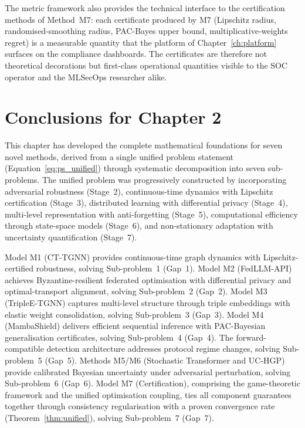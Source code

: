 The metric framework also provides the technical interface to the certification methods of Method~M7: each certificate produced by M7 (Lipschitz radius, randomised-smoothing radius, PAC-Bayes upper bound, multiplicative-weights regret) is a measurable quantity that the platform of Chapter~\ref{ch:platform} surfaces on the compliance dashboards. The certificates are therefore not theoretical decorations but first-class operational quantities visible to the SOC operator and the MLSecOps researcher alike.

\section{Conclusions for Chapter 2}
\label{sec:ch2_summary}

This chapter has developed the complete mathematical foundations for seven novel methods, derived from a single unified problem statement (Equation~\eqref{eq:ps_unified}) through systematic decomposition into seven sub-problems. The unified problem was progressively constructed by incorporating adversarial robustness (Stage~2), continuous-time dynamics with Lipschitz certification (Stage~3), distributed learning with differential privacy (Stage~4), multi-level representation with anti-forgetting (Stage~5), computational efficiency through state-space models (Stage~6), and non-stationary adaptation with uncertainty quantification (Stage~7).

Model M1 (CT-TGNN) provides continuous-time graph dynamics with Lipschitz-certified robustness, solving Sub-problem~1 (Gap~1). Model M2 (FedLLM-API) achieves Byzantine-resilient federated optimisation with differential privacy and optimal-transport alignment, solving Sub-problem~2 (Gap~2). Model M3 (TripleE-TGNN) captures multi-level structure through triple embeddings with elastic weight consolidation, solving Sub-problem~3 (Gap~3). Model M4 (MambaShield) delivers efficient sequential inference with PAC-Bayesian generalisation certificates, solving Sub-problem~4 (Gap~4). The forward-compatible detection architecture addresses protocol regime changes, solving Sub-problem~5 (Gap~5). Methods M5/M6 (Stochastic Transformer and UC-HGP) provide calibrated Bayesian uncertainty under adversarial perturbation, solving Sub-problem~6 (Gap~6). Model M7 (Certification), comprising the game-theoretic framework and the unified optimisation coupling, ties all component guarantees together through consistency regularisation with a proven convergence rate (Theorem~\ref{thm:unified}), solving Sub-problem~7 (Gap~7).

